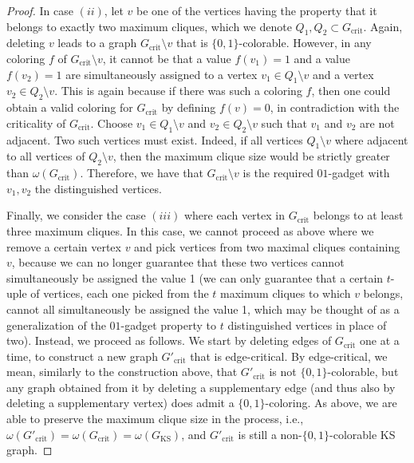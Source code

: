 \documentclass[twocolumn, a4paper, superscriptaddress,nofootinbib, accepted=2020-08-07, hyperref]{quantumarticle}
\begin{document}
\begin{proof}
In case $(ii)$, let $v$ be one of the vertices having the property that it belongs to exactly two maximum cliques, which we denote $Q_1, Q_2 \subset G_{\text{crit}}$. Again, deleting $v$ leads to a graph $G_{\text{crit}} \setminus v$ that is $\{0,1\}$-colorable. However, in any coloring $f$ of $G_{\text{crit}} \setminus v$, it cannot be that a value $f(v_1)=1$ and a value $f(v_2)=1$ are simultaneously assigned to a vertex $v_1 \in Q_1 \setminus v$ and a vertex $v_2 \in Q_2 \setminus v$. This is again because if there was such a coloring $f$, then one could obtain a valid coloring for $G_{\text{crit}}$ by defining $f(v) = 0$, in contradiction with the criticality of $G_{\text{crit}}$. Choose $v_1 \in Q_1 \setminus v$ and $v_2 \in Q_2 \setminus v$ such that $v_1$ and $v_2$ are not adjacent. Two such vertices must exist. Indeed, if all vertices $Q_1 \setminus v$ where adjacent to all vertices of $Q_2 \setminus v$, then the maximum clique size would be strictly greater than $\omega(G_\text{crit})$. Therefore, we have that $G_{\text{crit}} \setminus v$ is the required $01$-gadget with $v_1, v_2$ the distinguished vertices. 

Finally, we consider the case $(iii)$ where each vertex in $G_{\text{crit}}$ belongs to at least three maximum cliques. In this case, we cannot proceed as above where we remove a certain vertex $v$ and pick vertices from two maximal cliques containing $v$, because we can no longer guarantee that these two vertices cannot simultaneously be assigned the value 1 (we can only guarantee that a certain $t$-uple of vertices, each one picked from the $t$ maximum cliques to which $v$ belongs, cannot all simultaneously be assigned the value 1, which may be thought of as a generalization of the $01$-gadget property to $t$ distinguished vertices in place of two). Instead, we proceed as follows. 
We start by deleting edges of $G_{\text{crit}}$ one at a time, to construct a new graph $G'_{\text{crit}}$ that is edge-critical. By edge-critical, we mean, similarly to the construction above, that $G'_{\text{crit}}$ is not $\{0,1\}$-colorable, but any graph obtained from it by deleting a supplementary edge (and thus also by deleting a supplementary vertex) does admit a $\{0,1\}$-coloring. As above, we are able to preserve the maximum clique size in the process, i.e., $\omega(G'_{\text{crit}}) = \omega(G_{\text{crit}})=\omega(G_\text{KS})$, and $G'_{\text{crit}}$ is still a non-$\{0,1\}$-colorable KS graph.


\end{proof}
\end{document}
